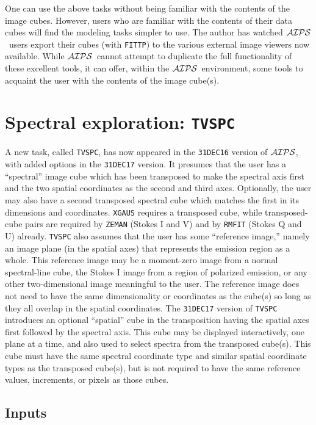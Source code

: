 \documentclass[twoside]{article}
\newcommand{\Me}[1]{\textcolor{mecol}{#1}}
\newcommand{\AIPS}{{$\cal AIPS\/$}}
\begin{document}
One can use the above tasks without being familiar with the contents
of the image cubes.  However, users who are familiar with the contents
of their data cubes will find the modeling tasks simpler to use.  The
author has watched \AIPS\ users export their cubes (with {\tt FITTP})
to the various external image viewers now available.  While \AIPS\
cannot attempt to duplicate the full functionality of these excellent
tools, it can offer, within the \AIPS\ environment, some tools to
acquaint the user with the contents of the image cube(s).

\section{Spectral exploration: {\tt TVSPC}}

A new task, called {\tt TVSPC}, has now appeared in the {\tt 31DEC16}
version of \AIPS, with added options in the {\tt 31DEC17} version.  It
presumes that the user has a ``spectral'' image cube which has been
transposed to make the spectral axis first and the two spatial
coordinates as the second and third axes.  Optionally, the user may
also have a second transposed spectral cube which matches the first in
its dimensions and coordinates.  {\tt XGAUS} requires a transposed
cube, while transposed-cube pairs are required by {\tt ZEMAN} (Stokes
I and V) and by {\tt RMFIT} (Stokes Q and U) already.  {\tt TVSPC}
also assumes that the user has some ``reference image,'' namely an
image plane (in the spatial axes) that represents the emission region
as a whole.  This reference image may be a moment-zero image from a
normal spectral-line cube, the Stokes I image from a region of
polarized emission, or any other two-dimensional image meaningful to
the user.  The reference image does not need to have the same
dimensionality or coordinates as the cube(s) so long as they all
overlap in the spatial coordinates.  \Me{The {\tt 31DEC17} version of
{\tt TVSPC} introduces an optional ``spatial'' cube in the
transposition having the spatial axes first followed by the spectral
axis.  This cube may be displayed interactively, one plane at a time,
and also used to select spectra from the transposed cube(s).  This
cube must have the same spectral coordinate type and similar spatial
coordinate types as the transposed cube(s), but is not required to
have the same reference values, increments, or pixels as those cubes.}

\subsection{Inputs}
\end{document}

